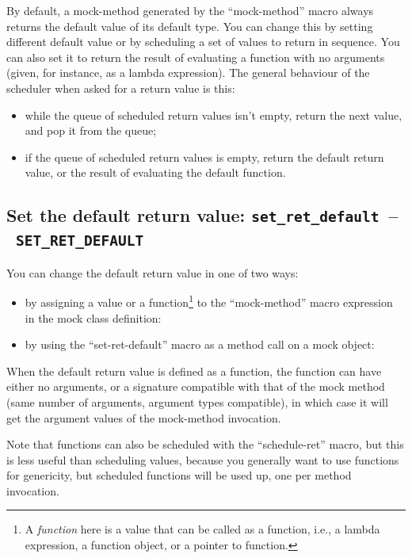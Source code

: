 \documentclass[twoside, a4paper, article]{memoir}
\newcommand*\testudocolor{\color{red!80!blue}}
\newcommand*\testudo[1]{\texttt{\testudocolor{}#1}}
\newcommand*\testudopair[2]{\testudo{#1}~--~\testudo{#2}}
\newcommand\subsectiontestudopair[3]{%
  \subsection[#1]{#1: \testudopair{#2}{#3}}}
\providecommand\typesetexample[1]{%
}
\begin{document}
By default, a mock-method generated by the ``mock-method'' macro always returns
the default value of its default type.  You can change this by setting
different default value or by scheduling a set of values to return in sequence.
You can also set it to return the result of evaluating a function with no
arguments (given, for instance, as a lambda expression).  The general behaviour
of the scheduler when asked for a return value is this:
\begin{itemize}
\item while the queue of scheduled return values isn't empty, return the next
  value, and pop it from the queue;
\item if the queue of scheduled return values is empty, return the default
  return value, or the result of evaluating the default function.
\end{itemize}

\subsectiontestudopair{Set the default return value}%
  {set\_ret\_default}{SET\_RET\_DEFAULT}

You can change the default return value in one of two ways:
\begin{itemize}
\item by assigning a value or a function\footnote{A \emph{function} here is a
    value that can be called as a function, i.e., a lambda expression, a
    function object, or a pointer to function.} to the ``mock-method'' macro
  expression in the mock class definition:

  \typesetexample{mock-class-mock-method-default-return-value-assign}

\item by using the ``set-ret-default'' macro as a method call on a mock object:

  \typesetexample{mock-class-mock-method-default-return-value-set-ret-default}

\end{itemize}

When the default return value is defined as a function, the function can have
either no arguments, or a signature compatible with that of the mock method
(same number of arguments, argument types compatible), in which case it will
get the argument values of the mock-method invocation.

Note that functions can also be scheduled with the ``schedule-ret'' macro, but
this is less useful than scheduling values, because you generally want to use
functions for genericity, but scheduled functions will be used up, one per
method invocation.
\end{document}
